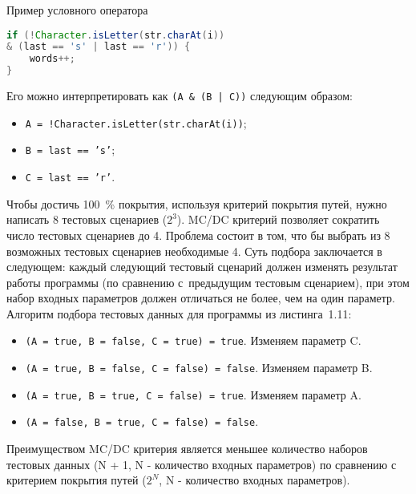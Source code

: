 \begin{ListingEnv}[!h]%
	\captiondelim{ } %
	\caption{Пример условного оператора}
	\begin{lstlisting}[language={Java}]
if (!Character.isLetter(str.charAt(i)) 
& (last == 's' | last == 'r')) {
	words++;
}
	\end{lstlisting}
\end{ListingEnv}%

Его можно интерпретировать как \texttt{(A \& (B | C))} следующим образом:

\begin{itemize}
	\item \texttt{A = !Character.isLetter(str.charAt(i))};
	\item \texttt{B = last == 's'};
	\item\texttt{C = last == 'r'}.
\end{itemize}

Чтобы достичь 100~\% покрытия, используя критерий покрытия путей, нужно написать 8 тестовых сценариев (\(2^3\)). MC/DC критерий позволяет сократить число тестовых сценариев до 4. Проблема состоит в том, что бы выбрать из 8 возможных тестовых сценариев необходимые 4. Суть подбора заключается в следующем:  каждый следующий тестовый сценарий должен изменять результат работы программы (по сравнению с~предыдущим тестовым сценарием), при этом набор входных параметров должен отличаться не более, чем на один параметр.  Алгоритм подбора тестовых данных для программы из листинга~1.11: 

\begin{itemize}
	\item \texttt{(A = true, B = false, C = true) = true}. Изменяем параметр C.
	\item \texttt{(A = true, B = false, C = false) = false}. Изменяем параметр B.
	\item \texttt{(A = true, B = true, C = false) = true}. Изменяем параметр A.
	\item \texttt{(A = false, B = true, C = false) = false}.
\end{itemize}

Преимуществом MC/DC критерия является меньшее количество наборов тестовых данных (N + 1, N - количество входных параметров) по сравнению с критерием покрытия путей (\(2^N\), N - количество входных параметров).


